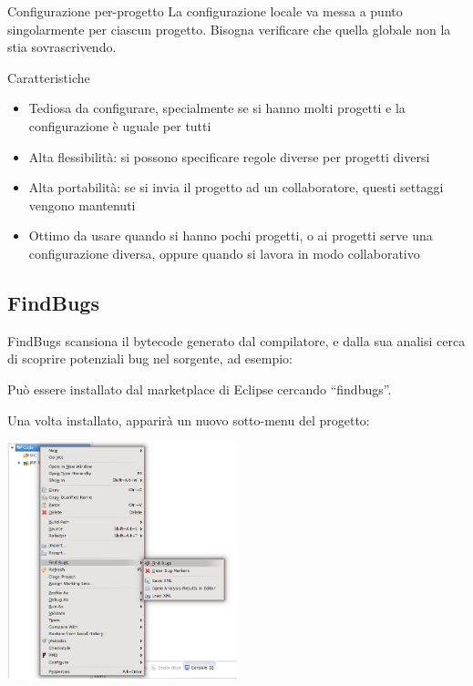 \documentclass[presentation]{beamer}
\begin{document}
\begin{frame}{Configurazione per-progetto}
  La configurazione locale va messa a punto singolarmente per ciascun progetto. Bisogna verificare che quella globale non la stia sovrascrivendo.
  \begin{block}{Caratteristiche}
    \begin{itemize}
      \item Tediosa da configurare, specialmente se si hanno molti progetti e la configurazione è uguale per tutti
      \item Alta flessibilità: si possono specificare regole diverse per progetti diversi
      \item Alta portabilità: se si invia il progetto ad un collaboratore, questi settaggi vengono mantenuti
      \item Ottimo da usare quando si hanno pochi progetti, o ai progetti serve una configurazione diversa, oppure quando si lavora in modo collaborativo
    \end{itemize}
  \end{block}
\end{frame}


\subsection{FindBugs}

 {
   {
      FindBugs scansiona il bytecode generato dal compilatore, e dalla sua analisi cerca di scoprire potenziali bug nel sorgente, ad esempio:
  }
}

 {
	 {
		Può essere installato dal marketplace di Eclipse cercando ``findbugs''.
		
		Una volta installato, apparirà un nuovo sotto-menu del progetto:
		
		\centering
		\includegraphics[width=0.5\textwidth]{img/findbugs}
	}
}
\end{document}
